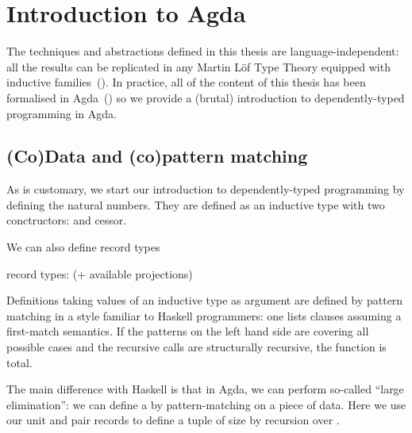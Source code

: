\chapter{Introduction to Agda}

The techniques and abstractions defined in this thesis are language-independent: all the
results can be replicated in any Martin L\"of Type Theory equipped with inductive
families~(\cite{dybjer1994inductive}). In practice, all of the content of this thesis
has been formalised in Agda~(\cite{norell2009dependently}) so we provide a (brutal)
introduction to dependently-typed programming in Agda.

\section{(Co)Data and (co)pattern matching}

As is customary, we start our introduction to dependently-typed programming by
defining the natural numbers. They are defined as an inductive type with two
conctructors:  and cessor.


We can also define record types

record types: (+ available projections)

\begin{minipage}{0.5\textwidth}
\end{minipage}
\begin{minipage}{0.5\textwidth}
\end{minipage}

Definitions taking values of an inductive type as argument are defined by
pattern matching in a style familiar to Haskell programmers: one lists
clauses assuming a first-match semantics. If the patterns on the left hand
side are covering all possible cases and the recursive calls are structurally
recursive, the function is total.

The main difference with Haskell is that in Agda, we can perform so-called
``large elimination'': we can define a  by pattern-matching on a
piece of data. Here we use our unit and pair records to define a tuple of
size  by recursion over .


